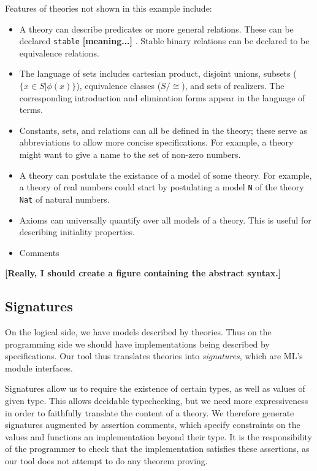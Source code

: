 \documentclass{article}
\newcommand{\comment}[1]{\textbf{[#1]}}
\begin{document}
Features of theories not shown in this example include:
\begin{itemize}
\item A theory can describe predicates
  or more general relations.  These can be declared 
  \Verb|stable| \comment{meaning...} .  Stable binary relations can be 
  declared to be equivalence relations.
\item The language of sets includes cartesian product, disjoint
  unions, subsets ($\{x\in S | \phi(x)\}$), 
  equivalence classes ($S/\cong$), and sets of realizers.  The
  corresponding introduction and elimination forms appear in
  the language of terms.
\item Constants, sets, and relations can all be defined in the theory;
  these serve as abbreviations to allow more concise specifications.
  For example, a theory might want to give a name to the set of 
  non-zero numbers.
\item A theory can postulate the existance of a model of some
  theory.  For example, a theory of real numbers could start by
  postulating a model \Verb|N| of the theory \Verb|Nat| of natural
  numbers.
\item Axioms can universally quantify over all models of a theory.
  This is useful for describing initiality properties.
\item Comments
\end{itemize}

\comment{Really, I should create a figure containing the abstract syntax.}

\subsection{Signatures}
\label{sec:signatures}

On the logical side, we have models described by theories.  Thus on
the programming side we should have implementations being described by
specifications.  Our tool thus translates theories into
\emph{signatures}, which are ML's module interfaces.

Signatures allow us to require the existence of certain types, as well
as values of given type.  This allows decidable typechecking, but we
need more expressiveness in order to faithfully translate the content
of a theory.  We therefore generate signatures augmented by assertion
comments, which specify constraints on the values and functions an
implementation beyond their type.  It is the responsibility of the
programmer to check that the implementation satisfies these
assertions, as our tool does not attempt to do any theorem proving.
\end{document}
